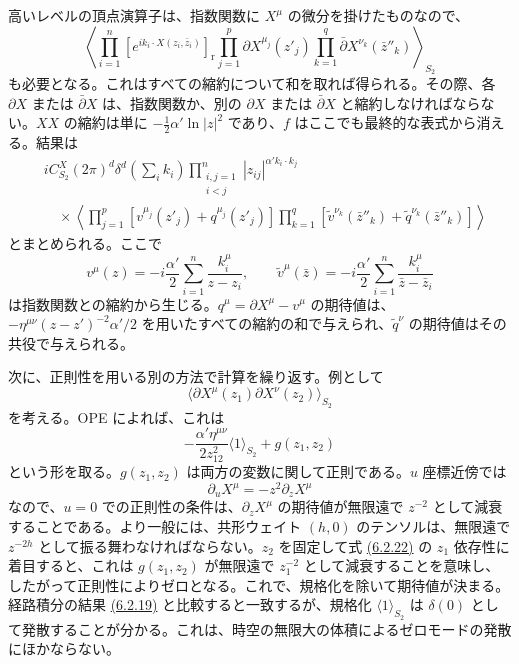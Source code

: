 高いレベルの頂点演算子は、指数関数に $X^\mu$ の微分を掛けたものなので、
\begin{equation}
\left\langle\prod_{i=1}^n\left[e^{ik_i\cdot X(z_i,\bar z_i)}\right]_{\mathrm r}
\prod_{j=1}^p\partial X^{\mu_j}(z'_j)
\prod_{k=1}^q\bar\partial X^{\nu_k}(\bar z''_k)\right\rangle_{S_2}
\tag{6.2.18}\label{eq:6.2.18}
\end{equation}
も必要となる。これはすべての縮約について和を取れば得られる。その際、各 $\partial X$ または $\bar\partial X$ は、指数関数か、別の $\partial X$ または $\bar\partial X$ と縮約しなければならない。$XX$ の縮約は単に $-\tfrac12\alpha'\ln|z|^2$ であり、$f$ はここでも最終的な表式から消える。結果は
\begin{equation}
\begin{aligned}
&iC_{S_2}^X(2\pi)^d\delta^d\!\left(\sum_i k_i\right)
\prod_{\substack{i,j=1\\i<j}}^n|z_{ij}|^{\alpha'k_i\cdot k_j}\\
&\quad\times\left\langle
\prod_{j=1}^p\left[v^{\mu_j}(z'_j)+q^{\mu_j}(z'_j)\right]
\prod_{k=1}^q\left[\widetilde v^{\nu_k}(\bar z''_k)+\widetilde q^{\nu_k}(\bar z''_k)\right]
\right\rangle
\end{aligned}
\tag{6.2.19}\label{eq:6.2.19}
\end{equation}
とまとめられる。ここで
\begin{equation}
v^\mu(z)=-i\frac{\alpha'}2\sum_{i=1}^n\frac{k_i^\mu}{z-z_i},
\qquad
\widetilde v^\mu(\bar z)=-i\frac{\alpha'}2\sum_{i=1}^n\frac{k_i^\mu}{\bar z-\bar z_i}
\tag{6.2.20}\label{eq:6.2.20}
\end{equation}
は指数関数との縮約から生じる。$q^\mu=\partial X^\mu-v^\mu$ の期待値は、$-\eta^{\mu\nu}(z-z')^{-2}\alpha'/2$ を用いたすべての縮約の和で与えられ、$\widetilde q^\nu$ の期待値はその共役で与えられる。

次に、正則性を用いる別の方法で計算を繰り返す。例として
\begin{equation}
\langle\partial X^\mu(z_1)\partial X^\nu(z_2)\rangle_{S_2}
\tag{6.2.21}\label{eq:6.2.21}
\end{equation}
を考える。OPE によれば、これは
\begin{equation}
-\frac{\alpha'\eta^{\mu\nu}}{2z_{12}^2}\langle1\rangle_{S_2}+g(z_1,z_2)
\tag{6.2.22}\label{eq:6.2.22}
\end{equation}
という形を取る。$g(z_1,z_2)$ は両方の変数に関して正則である。$u$ 座標近傍では
\begin{equation}
\partial_uX^\mu=-z^2\partial_zX^\mu
\tag{6.2.23}\label{eq:6.2.23}
\end{equation}
なので、$u=0$ での正則性の条件は、$\partial_zX^\mu$ の期待値が無限遠で $z^{-2}$ として減衰することである。より一般には、共形ウェイト $(h,0)$ のテンソルは、無限遠で $z^{-2h}$ として振る舞わなければならない。$z_2$ を固定して式 \hyperref[eq:6.2.22]{(6.2.22)} の $z_1$ 依存性に着目すると、これは $g(z_1,z_2)$ が無限遠で $z_1^{-2}$ として減衰することを意味し、したがって正則性によりゼロとなる。これで、規格化を除いて期待値が決まる。経路積分の結果 \hyperref[eq:6.2.19]{(6.2.19)} と比較すると一致するが、規格化 $\langle1\rangle_{S_2}$ は $\delta(0)$ として発散することが分かる。これは、時空の無限大の体積によるゼロモードの発散にほかならない。

